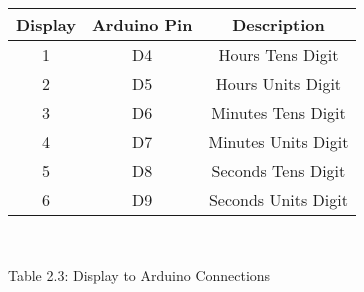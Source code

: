 \centering
\begin{tabular}{|c|c|c|}
\hline
Display & Arduino Pin & Description\\
\hline
1  & D4 & Hours Tens Digit\\
\hline
2  & D5 & Hours Units Digit\\
\hline
3  & D6 & Minutes Tens Digit\\
\hline
4  & D7 & Minutes Units Digit\\
\hline
5 & D8 & Seconds Tens Digit\\
\hline
6  & D9 & Seconds Units Digit\\
\hline
\end{tabular}\\
\centerline{Table 2.3: Display to Arduino Connections}
